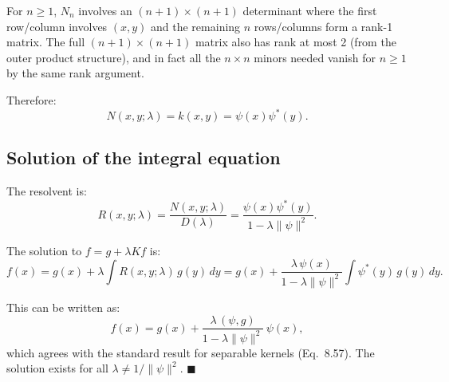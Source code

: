 \documentclass[12pt]{article}
\begin{document}
For $n \ge 1$, $N_n$ involves an $(n+1) \times (n+1)$ determinant where the first row/column involves $(x,y)$ and the remaining $n$ rows/columns form a rank-1 matrix. The full $(n+1) \times (n+1)$ matrix also has rank at most 2 (from the outer product structure), and in fact all the $n \times n$ minors needed vanish for $n \ge 1$ by the same rank argument.

Therefore:
\[
\boxed{N(x,y;\lambda) = k(x,y) = \psi(x)\psi^*(y)}.
\]

\subsection*{Solution of the integral equation}

The resolvent is:
\[
R(x,y;\lambda) = \frac{N(x,y;\lambda)}{D(\lambda)} = \frac{\psi(x)\psi^*(y)}{1 - \lambda\|\psi\|^2}.
\]

The solution to $f = g + \lambda Kf$ is:
\[
f(x) = g(x) + \lambda\int R(x,y;\lambda)\,g(y)\,dy = g(x) + \frac{\lambda\,\psi(x)}{1 - \lambda\|\psi\|^2}\int \psi^*(y)\,g(y)\,dy.
\]

This can be written as:
\[
\boxed{f(x) = g(x) + \frac{\lambda\,(\psi, g)}{1 - \lambda\|\psi\|^2}\,\psi(x)},
\]
which agrees with the standard result for separable kernels (Eq.~8.57). The solution exists for all $\lambda \neq 1/\|\psi\|^2$. \hfill $\blacksquare$
\end{document}
